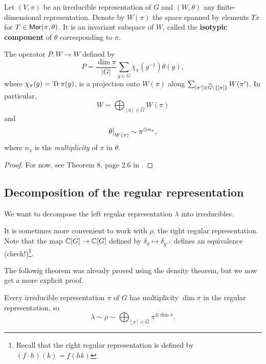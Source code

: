 \documentclass[11pt, english]{article}
\begin{document}
Let $(V,\pi)$ be an irreducible representation of $G$ and $(W,\theta)$ any finite-dimensional representation. Denote by $W(\pi)$ the space spanned by elements $Tx$ for $T \in \mathsf{Mor}(\pi,\theta)$. It is an invariant subspace of $W$, called the \textbf{isotypic component} of $\theta$ corresponding to $\pi$. 


\begin{lemma}
The operator $P:W \to W$ defined by
$$
P = \frac{\dim \pi}{\lvert G \rvert} \sum_{g \in G} \chi_\pi(g^{-1})\theta(g),
$$
where $\chi_\pi(g)=\operatorname{Tr} \pi(g)$, is a projection onto $W(\pi)$ along $\sum_{[\pi'] \in  \widehat G  \backslash \{ [\pi] \}} W(\pi')$. In particular, $$
W = \bigoplus_{[\pi] \in \widehat G} W(\pi)
$$
and 
$$
\restr{\theta}{W(\pi)} \sim \pi^{\oplus n_\pi},
$$
where $n_\pi$ is the \emph{multiplicity} of $\pi$ in $\theta$.
\end{lemma}

\begin{proof}
For now, see Theorem 8, page 2.6 in \cite{serre_linrep}.
\end{proof}

\subsection{Decomposition of the regular representation}

We want to decompose the left regular representation $\lambda$ into irreducibles.

It is sometimes more convenient to work with $\rho$, the right regular representation. Note that the map $\mathbb{C}[G] \to \mathbb{C}[G]$ defined by $\delta_g \mapsto \delta_{g^{-1}}$ defines an equivalence (check!)\footnote{Recall that the right regular representation is defined by $(f \cdot h )(k) = f(hk)$}. 

The followig theorem was already proved using the density theorem, but we now get a more explicit proof.

\begin{thm}
Every irreducible representation $\pi$ of $G$ has multiplicity $\dim \pi$ in the regular representation, so
$$
\lambda \sim \rho \sim \bigoplus_{[\pi] \in \widehat G} \pi^{\oplus \dim \pi}.
$$
\label{thmspan}
\end{thm}
\end{document}
